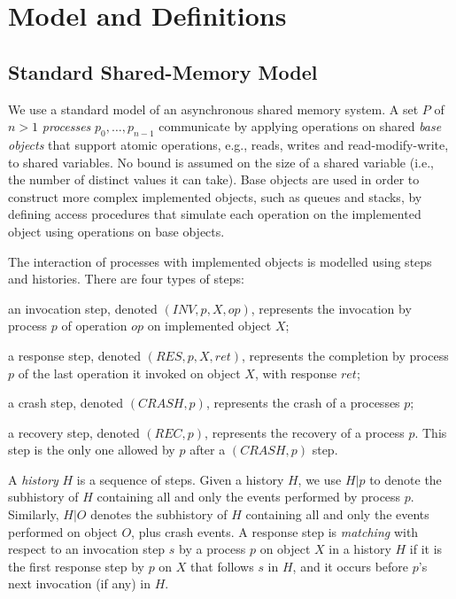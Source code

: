 
\section{Model and Definitions}
\label{section: Model}

\subsection{Standard Shared-Memory Model}

We use a standard model of an asynchronous shared memory system. A set $P$ of $n > 1$ \textit{processes} $p_0, \ldots, p_{n-1}$ communicate by applying operations on shared \textit{base objects} that support atomic operations, e.g., reads, writes and read-modify-write, to shared variables. No bound is assumed on the size of a shared variable (i.e., the number of distinct values it can take).
Base objects are used in order to construct more complex implemented objects, such as queues and stacks, by defining access procedures that simulate each operation on the implemented object using operations on base objects.

The interaction of processes with implemented objects is modelled using steps and histories. There are four types of steps:
\begin{inparaenum}[(1)]
	\item an invocation step, denoted $(INV, p, X, op)$, represents the invocation by process $p$ of operation $op$ on implemented object $X$;
	\item a response step, denoted $(RES, p, X, ret)$, represents the completion by process $p$ of the last operation it invoked on object $X$, with response $ret$;
	\item a crash step, denoted $(CRASH, p)$, represents the crash of a processes $p$;
	\item a recovery step, denoted $(REC, p)$, represents the recovery of a process $p$. This step is the only one allowed by $p$ after a $(CRASH, p)$ step.
\end{inparaenum}

A \textit{history} $H$ is a sequence of steps. Given a history $H$, we use $H | p$ to denote the subhistory of $H$ containing all and only the events performed by process $p$. Similarly, $H | O$ denotes the subhistory of $H$ containing all and only the events performed on object $O$, plus crash events.
A response step is \textit{matching} with respect to an invocation step $s$ by a process $p$ on object $X$ in a history $H$ if it is the first response step by $p$ on $X$ that follows $s$ in $H$, and it occurs before $p$'s next invocation (if any) in $H$.

